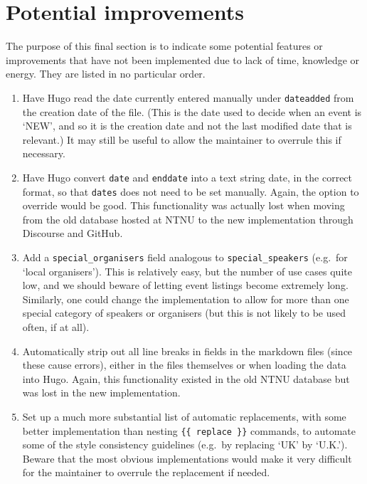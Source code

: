 \documentclass[12pt]{scrartcl}
\theoremstyle{definition}
\begin{document}
\section{Potential improvements}
The purpose of this final section is to indicate some potential features or improvements that have not been implemented due to lack of time, knowledge or energy.
They are listed in no particular order.

\begin{enumerate}
\item Have Hugo read the date currently entered manually under \verb|dateadded| from the creation date of the file.
(This is the date used to decide when an event is `NEW', and so it is the creation date and not the last modified date that is relevant.)
It may still be useful to allow the maintainer to overrule this if necessary.
\item Have Hugo convert \verb|date| and \verb|enddate| into a text string date, in the correct format, so that \verb|dates| does not need to be set manually.
Again, the option to override would be good.
This functionality was actually lost when moving from the old database hosted at NTNU to the new implementation through Discourse and GitHub.
\item Add a \verb|special_organisers| field analogous to \verb|special_speakers| (e.g.\ for `local organisers').
This is relatively easy, but the number of use cases quite low, and we should beware of letting event listings become extremely long.
Similarly, one could change the implementation to allow for more than one special category of speakers or organisers (but this is not likely to be used often, if at all).
\item Automatically strip out all line breaks in fields in the markdown files (since these cause errors), either in the files themselves or when loading the data into Hugo. Again, this functionality existed in the old NTNU database but was lost in the new implementation.
\item Set up a much more substantial list of automatic replacements, with some better implementation than nesting \verb|{{ replace }}| commands, to automate some of the style consistency guidelines (e.g.\ by replacing `UK' by `U.K.'). Beware that the most obvious implementations would make it very difficult for the maintainer to overrule the replacement if needed.
\end{enumerate}
\end{document}

